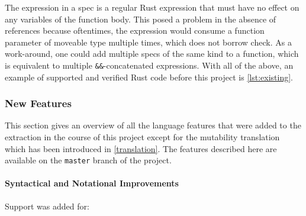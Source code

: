 The expression in a spec is a regular Rust expression that must have no effect
on any variables of the function body. This posed a problem in the absence of
references because oftentimes, the expression would consume a function parameter
of moveable type multiple times, which does not borrow check. As a work-around,
one could add multiple specs of the same kind to a function, which is equivalent
to multiple \lstinline!&&!-concatenated expressions. With all of the above, an
example of supported and verified Rust code before this project is
\autoref{lst:existing}.

\subsubsection{New Features}

This section gives an overview of all the language features that were added to
the extraction in the course of this project except for the mutability
translation which has been introduced in \autoref{translation}. The features
described here are available on the \lstinline!master! branch of the project.

\paragraph{Syntactical and Notational Improvements}

Support was added for:

